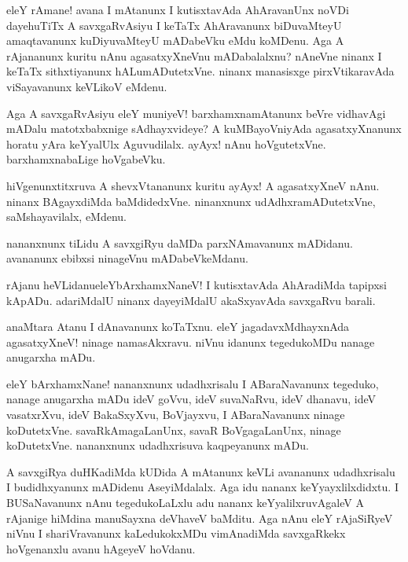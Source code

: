 \begin{mng}
eleY rAmane! avana I mAtanunx I kutisxtavAda AhAravanUnx noVDi dayehuTiTx A savxgaRvAsiyu I keTaTx AhAravanunx biDuvaMteyU amaqtavanunx kuDiyuvaMteyU mADabeVku eMdu koMDenu. Aga A rAjananunx kuritu nAnu agasatxyXneVnu mADabalalxnu? nAneVne ninanx I keTaTx sithxtiyanunx hALumADutetxVne. ninanx manasisxge pirxVtikaravAda viSayavanunx keVLikoV eMdenu.
\end{mng}

\begin{mng}
Aga A savxgaRvAsiyu eleY muniyeV! barxhamxnamAtanunx beVre vidhavAgi mADalu matotxbabxnige sAdhayxvideye? A kuMBayoVniyAda agasatxyXnanunx horatu yAra keYyalUlx Aguvudilalx. ayAyx! nAnu hoVgutetxVne. barxhamxnabaLige hoVgabeVku.
\end{mng}

\begin{mng}
hiVgenunxtitxruva A shevxVtananunx kuritu ayAyx! A agasatxyXneV nAnu. ninanx BAgayxdiMda baMdidedxVne. ninanxnunx udAdhxramADutetxVne, saMshayavilalx, eMdenu.
\end{mng}

\begin{mng}
nananxnunx tiLidu A savxgiRyu daMDa parxNAmavanunx mADidanu. avananunx ebibxsi ninageVnu mADabeVkeMdanu. 
\end{mng}

\begin{mng}
rAjanu heVLidanu\mdash eleYbArxhamxNaneV! I kutisxtavAda AhAradiMda tapipxsi kApADu. adariMdalU ninanx dayeyiMdalU akaSxyavAda savxgaRvu barali.
\end{mng}

\begin{mng}
anaMtara Atanu I dAnavanunx koTaTxnu. eleY jagadavxMdhayxnAda agasatxyXneV! ninage namasAkxravu. niVnu idanunx tegedukoMDu nanage anugarxha mADu.
\end{mng}

\begin{mng}
eleY bArxhamxNane! nananxnunx udadhxrisalu I ABaraNavanunx tegeduko, nanage anugarxha mADu ideV goVvu, ideV suvaNaRvu, ideV dhanavu, ideV vasatxrXvu, ideV BakaSxyXvu, BoVjayxvu, I ABaraNavanunx ninage koDutetxVne. savaRkAmagaLanUnx, savaR BoVgagaLanUnx, ninage koDutetxVne. nananxnunx udadhxrisuva kaqpeyanunx mADu.
\end{mng}

\begin{mng}
A savxgiRya duHKadiMda kUDida A mAtanunx keVLi avananunx udadhxrisalu I budidhxyanunx mADidenu AseyiMdalalx. Aga idu nananx keYyayxlilxdidxtu. I BUSaNavanunx nAnu tegedukoLaLxlu adu nananx keYyalilxruvAgaleV A rAjanige hiMdina manuSayxna deVhaveV baMditu. Aga nAnu eleY rAjaSiRyeV niVnu I shariVravanunx kaLedukokxMDu vimAnadiMda savxgaRkekx hoVgenanxlu avanu hAgeyeV hoVdanu.
\end{mng}

